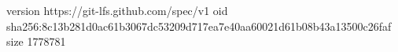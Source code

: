 version https://git-lfs.github.com/spec/v1
oid sha256:8c13b281d0ac61b3067dc53209d717ea7e40aa60021d61b08b43a13500c26faf
size 1778781
